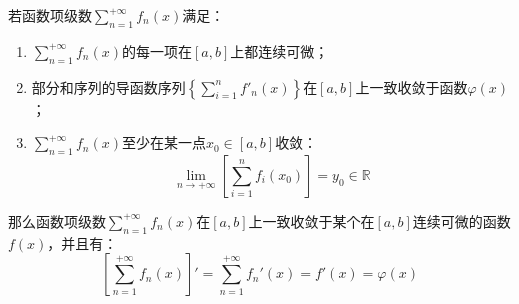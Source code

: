 \begin{theorem}
	若函数项级数$\sum\limits_{n=1}^{+\infty}f_n(x)$满足：
	\begin{enumerate}
		\item $\sum\limits_{n=1}^{+\infty}f_n(x)$的每一项在$[a,b]$上都连续可微；
		\item 部分和序列的导函数序列$\left\{\sum\limits_{i=1}^{n}f'_n(x)\right\}$在$[a,b]$上一致收敛于函数$\varphi(x)$；
		\item $\sum\limits_{n=1}^{+\infty}f_n(x)$至少在某一点$x_0\in[a,b]$收敛：
		\begin{equation*}
			\lim_{n\to+\infty}\left[\sum_{i=1}^{n}f_i(x_0)\right]=y_0\in\mathbb{R}
		\end{equation*}
	\end{enumerate}
	那么函数项级数$\sum\limits_{n=1}^{+\infty}f_n(x)$在$[a,b]$上一致收敛于某个在$[a,b]$连续可微的函数$f(x)$，并且有：
	\begin{equation*}
		\left[\sum_{n=1}^{+\infty}f_n(x)\right]'=\sum_{n=1}^{+\infty}f_n'(x)=f'(x)=\varphi(x)
	\end{equation*}
\end{theorem}